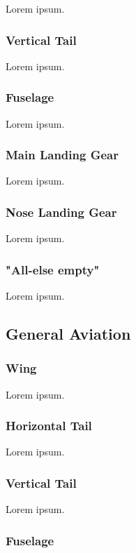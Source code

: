 Lorem ipsum.

\subsubsection{Vertical Tail}

Lorem ipsum.

\subsubsection{Fuselage}

Lorem ipsum.

\subsubsection{Main Landing Gear}

Lorem ipsum.

\subsubsection{Nose Landing Gear}

Lorem ipsum.

\subsubsection{"All-else empty"}

Lorem ipsum.

\subsection{General Aviation}

\subsubsection{Wing}

Lorem ipsum.

\subsubsection{Horizontal Tail}

Lorem ipsum.

\subsubsection{Vertical Tail}

Lorem ipsum.

\subsubsection{Fuselage}

